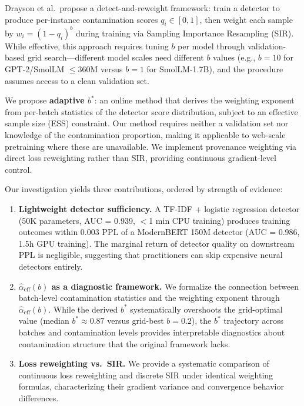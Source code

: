 \documentclass[11pt]{article}
\begin{document}
Drayson et al.\ propose a detect-and-reweight framework: train a detector to produce per-instance contamination scores $q_i \in [0,1]$, then weight each sample by $w_i = (1 - q_i)^b$ during training via Sampling Importance Resampling (SIR).
While effective, this approach requires tuning $b$ per model through validation-based grid search---different model scales need different $b$ values (e.g., $b=10$ for GPT-2/SmolLM $\leq$360M versus $b=1$ for SmolLM-1.7B), and the procedure assumes access to a clean validation set.

We propose \textbf{adaptive $b^*$}: an online method that derives the weighting exponent from per-batch statistics of the detector score distribution, subject to an effective sample size (ESS) constraint.
Our method requires neither a validation set nor knowledge of the contamination proportion, making it applicable to web-scale pretraining where these are unavailable.
We implement provenance weighting via direct loss reweighting rather than SIR, providing continuous gradient-level control.

Our investigation yields three contributions, ordered by strength of evidence:

\begin{enumerate}
    \item \textbf{Lightweight detector sufficiency.} A TF-IDF + logistic regression detector (50K parameters, AUC = 0.939, $<$1 min CPU training) produces training outcomes within 0.003 PPL of a ModernBERT 150M detector (AUC = 0.986, 1.5h GPU training).
    The marginal return of detector quality on downstream PPL is negligible, suggesting that practitioners can skip expensive neural detectors entirely.

    \item \textbf{$\hat{\alpha}_{\mathrm{eff}}(b)$ as a diagnostic framework.} We formalize the connection between batch-level contamination statistics and the weighting exponent through $\hat{\alpha}_{\mathrm{eff}}(b)$.
    While the derived $b^*$ systematically overshoots the grid-optimal value (median $b^* \approx 0.87$ versus grid-best $b = 0.2$), the $b^*$ trajectory across batches and contamination levels provides interpretable diagnostics about contamination structure that the original framework lacks.

    \item \textbf{Loss reweighting vs.\ SIR.} We provide a systematic comparison of continuous loss reweighting and discrete SIR under identical weighting formulas, characterizing their gradient variance and convergence behavior differences.
\end{enumerate}
\end{document}
